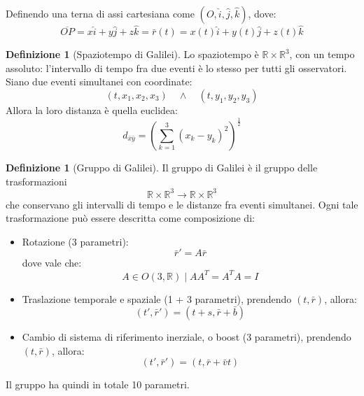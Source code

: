 \documentclass[11pt, a4paper, openright]{book}
\theoremstyle{plain}
\theoremstyle{definition}
\newtheorem{definizione}[teorema]{Definizione}
\theoremstyle{remark}
\begin{document}
Definendo una terna di assi cartesiana come $(O, \hat{i}, \hat{j}, \hat{k})$, dove:
\begin{equation}
    \overline{OP} = x\hat{i} + y\hat{j} + z\hat{k} = \bar{r}(t) = x(t)\hat{i} + y(t)\hat{j} + z(t)\hat{k}
\end{equation}

\begin{definizione}[Spaziotempo di Galilei]
    Lo spaziotempo è $\mathbb{R} \times \mathbb{R}^3$, con un tempo assoluto: l'intervallo di tempo fra due eventi è lo stesso per tutti gli osservatori. Siano due eventi simultanei con coordinate:
    \begin{equation}
        (t, x_1, x_2, x_3) \quad \wedge \quad (t, y_1, y_2, y_3)
    \end{equation}
    Allora la loro distanza è quella euclidea:
    \begin{equation}
        d_{\bar{x}\bar{y}} = \left(\sum_{k = 1}^{3} (x_k - y_k)^2\right)^{\frac{1}{2}}
    \end{equation}
\end{definizione}

\begin{definizione}[Gruppo di Galilei]
    Il gruppo di Galilei è il gruppo delle trasformazioni
    \begin{equation}
        \mathbb{R} \times \mathbb{R}^3 \longrightarrow \mathbb{R} \times \mathbb{R}^3
    \end{equation}
    che conservano gli intervalli di tempo e le distanze fra eventi simultanei. Ogni tale trasformazione può essere descritta come composizione di:
    \begin{itemize}
        \item Rotazione (3 parametri):
        \begin{equation}
            \bar{r}' = A \bar{r}
        \end{equation}
        dove vale che:
        \begin{equation}
            A \in O(3, \mathbb{R}) \mid AA^T = A^TA = I
        \end{equation}
        \item Traslazione temporale e spaziale (1 + 3 parametri), prendendo $(t, \bar{r})$, allora:
        \begin{equation}
            (t', \bar{r}') = (t + s, \bar{r} + \bar{b})
        \end{equation}
        \item Cambio di sistema di riferimento inerziale, o boost (3 parametri), prendendo $(t, \bar{r})$, allora:
        \begin{equation}
            (t', \bar{r}') = (t, \bar{r} + \bar{v}t)
        \end{equation}
    \end{itemize}
    Il gruppo ha quindi in totale 10 parametri.
\end{definizione}
\end{document}
